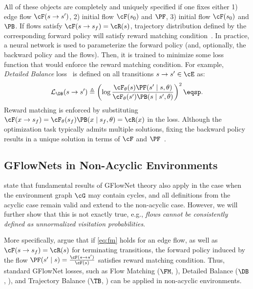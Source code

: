 All of these objects are completely and uniquely specified if one fixes either 1) edge flow $\cF(s \to s')$, 2) initial flow $\cF(s_0)$ and $\PF$, 3) initial flow $\cF(s_0)$ and $\PB$.
If flows satisfy $\cF(s \to s_f) = \cR(s)$, trajectory distribution defined by the corresponding forward policy will satisfy reward matching condition~\cite{bengio2023gflownet}. In practice, a neural network is used to parameterize the forward policy (and, optionally, the backward policy and the flows). Then, it is trained to minimize some loss function that would enforce the reward matching condition. For example, \textit{Detailed Balance} loss~\cite{bengio2023gflownet} is defined on all transitions $s \to s^{\prime} \in \cE$ as:
\begin{equation}
\label{eq:DB_loss}
\mathcal{L}_{\DB}(s \to s^{\prime}) \triangleq \left(\log \frac{\cF_{\theta}(s) \PF(s' \mid s, \theta)}{\cF_{\theta}(s')\PB(s \mid s', \theta)} \right)^2\eqsp.
\end{equation}
Reward matching is enforced by substituting $\cF(x \to s_f) = \cF_{\theta}(s_f)\PB(x \mid s_f, \theta) = \cR(x)$ in the loss. 
Although the optimization task typically admits multiple solutions, fixing the backward policy results in a unique solution in terms of  $\cF$ and $\PF$~\cite{bengio2023gflownet}.




\subsection{GFlowNets in Non-Acyclic Environments}

\citet{brunswic2024theory} state that fundamental results of GFlowNet theory also apply in the case when the environment graph $\cG$ may contain cycles, and
all definitions from the acyclic case remain valid and extend to the non-acyclic case.
However, we will further show that this is not exactly true, e.g., \textit{flows cannot be consistently defined as unnormalized visitation probabilities}. 

More specifically, \citet{brunswic2024theory} argue that if \eqref{eq:fm} holds for an edge flow, as well as $\cF(s \to s_f) = \cR(s)$ for terminating transitions, the forward policy induced by the flow $\PF(s' \mid s) = \frac{\cF(s \to s')}{\cF(s)}$ satisfies reward matching condition. Thus, standard GFlowNet losses, such as Flow Matching ($\FM$, \citealp{bengio2021flow}), Detailed Balance ($\DB$, \citealp{bengio2023gflownet}), and Trajectory Balance ($\TB$, \citealp{malkin2022trajectory}) can be applied in non-acyclic environments.

